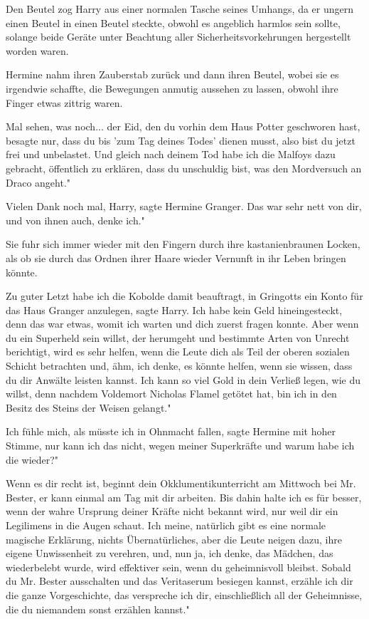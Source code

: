 Den Beutel zog Harry aus einer normalen Tasche seines Umhangs, da er ungern
einen Beutel in einen Beutel steckte, obwohl es angeblich harmlos sein sollte,
solange beide Geräte unter Beachtung aller Sicherheitsvorkehrungen hergestellt
worden waren.

Hermine nahm ihren Zauberstab zurück und dann ihren Beutel, wobei sie es
irgendwie schaffte, die Bewegungen anmutig aussehen zu lassen, obwohl ihre
Finger etwas zittrig waren.

\glqq Mal sehen, was noch... der Eid, den du vorhin dem Haus Potter geschworen
hast, besagte nur, dass du bis 'zum Tag deines Todes' dienen musst, also bist du
jetzt frei und unbelastet. Und gleich nach deinem Tod habe ich die Malfoys dazu
gebracht, öffentlich zu erklären, dass du unschuldig bist, was den Mordversuch
an Draco angeht."

\glqq Vielen Dank noch mal, Harry\grqq{}, sagte Hermine Granger. \glqq Das war
sehr nett von dir, und von ihnen auch, denke ich."

Sie fuhr sich immer wieder mit den Fingern durch ihre kastanienbraunen Locken,
als ob sie durch das Ordnen ihrer Haare wieder Vernunft in ihr Leben bringen
könnte.

\glqq Zu guter Letzt habe ich die Kobolde damit beauftragt, in Gringotts ein
Konto für das Haus Granger anzulegen\grqq{}, sagte Harry. \glqq Ich habe kein
Geld hineingesteckt, denn das war etwas, womit ich warten und dich zuerst fragen
konnte. Aber wenn du ein Superheld sein willst, der herumgeht und bestimmte
Arten von Unrecht berichtigt, wird es sehr helfen, wenn die Leute dich als Teil
der oberen sozialen Schicht betrachten und, ähm, ich denke, es könnte helfen,
wenn sie wissen, dass du dir Anwälte leisten kannst. Ich kann so viel Gold in
dein Verließ legen, wie du willst, denn nachdem Voldemort Nicholas Flamel
getötet hat, bin ich in den Besitz des Steins der Weisen gelangt."

\glqq Ich fühle mich, als müsste ich in Ohnmacht fallen\grqq{}, sagte Hermine
mit hoher Stimme, \glqq nur kann ich das nicht, wegen meiner Superkräfte und
warum habe ich die wieder?"

\glqq Wenn es dir recht ist, beginnt dein Okklumentikunterricht am Mittwoch bei
Mr. Bester, er kann einmal am Tag mit dir arbeiten. Bis dahin halte ich es für
besser, wenn der wahre Ursprung deiner Kräfte nicht bekannt wird, nur weil dir
ein Legilimens in die Augen schaut. Ich meine, natürlich gibt es eine normale
magische Erklärung, nichts Übernatürliches, aber die Leute neigen dazu, ihre
eigene Unwissenheit zu verehren, und, nun ja, ich denke, das Mädchen, das
wiederbelebt wurde, wird effektiver sein, wenn du geheimnisvoll bleibst. Sobald
du Mr. Bester ausschalten und das Veritaserum besiegen kannst, erzähle ich dir
die ganze Vorgeschichte, das verspreche ich dir, einschließlich all der
Geheimnisse, die du niemandem sonst erzählen kannst."


